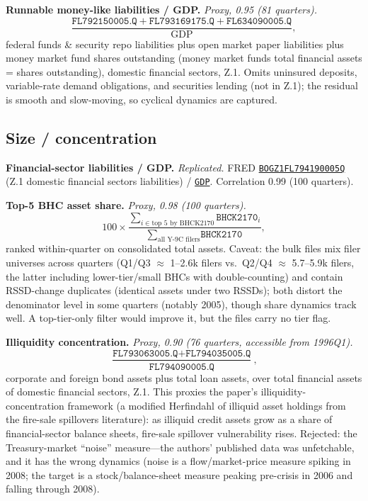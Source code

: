 \documentclass[11pt]{article}
\newcommand{\fred}[1]{\href{https://fred.stlouisfed.org/series/#1}{\texttt{#1}}}
\begin{document}
\textbf{Runnable money-like liabilities / GDP.} \textit{Proxy, 0.95 (81
quarters).}
\begin{equation}
\frac{\texttt{FL792150005.Q} + \texttt{FL793169175.Q}
+ \texttt{FL634090005.Q}}{\text{GDP}},
\end{equation}
federal funds \& security repo liabilities plus open market paper
liabilities plus money market fund shares outstanding (money market
funds total financial assets = shares outstanding), domestic financial
sectors, Z.1.  Omits uninsured deposits, variable-rate demand
obligations, and securities lending (not in Z.1); the residual is smooth
and slow-moving, so cyclical dynamics are captured.

\subsection{Size / concentration}

\textbf{Financial-sector liabilities / GDP.} \textit{Replicated.} FRED
\fred{BOGZ1FL794190005Q} (Z.1 domestic financial sectors liabilities)
/ \fred{GDP}.  Correlation 0.99 (100 quarters).

\textbf{Top-5 BHC asset share.} \textit{Proxy, 0.98 (100 quarters).}
\begin{equation}
100 \times \frac{\sum_{i \in \text{top 5 by BHCK2170}} \texttt{BHCK2170}_i}
{\sum_{\text{all Y-9C filers}} \texttt{BHCK2170}},
\end{equation}
ranked within-quarter on consolidated total assets.  Caveat: the bulk
files mix filer universes across quarters (Q1/Q3 $\approx$ 1--2.6k
filers vs.\ Q2/Q4 $\approx$ 5.7--5.9k filers, the latter including
lower-tier/small BHCs with double-counting) and contain RSSD-change
duplicates (identical assets under two RSSDs); both distort the
denominator level in some quarters (notably 2005), though share
dynamics track well.  A top-tier-only filter would improve it, but the
files carry no tier flag.

\textbf{Illiquidity concentration.} \textit{Proxy, 0.90 (76 quarters,
accessible from 1996Q1).}
\begin{equation}
\frac{\texttt{FL793063005.Q} + \texttt{FL794035005.Q}}
{\texttt{FL794090005.Q}},
\end{equation}
corporate and foreign bond assets plus total loan assets, over total
financial assets of domestic financial sectors, Z.1.  This proxies the
paper's illiquidity-concentration framework (a modified Herfindahl of
illiquid asset holdings from the fire-sale spillovers literature): as
illiquid credit assets grow as a share of financial-sector balance
sheets, fire-sale spillover vulnerability rises.  Rejected: the
Treasury-market ``noise'' measure---the authors' published data was
unfetchable, and it has the wrong dynamics (noise is a flow/market-price
measure spiking in 2008; the target is a stock/balance-sheet measure
peaking pre-crisis in 2006 and falling through 2008).
\end{document}
